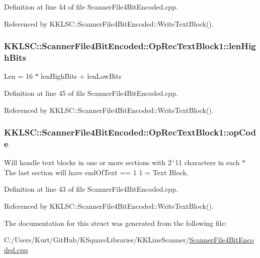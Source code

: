 Definition at line 44 of file Scanner\+File4\+Bit\+Encoded.\+cpp.



Referenced by K\+K\+L\+S\+C\+::\+Scanner\+File4\+Bit\+Encoded\+::\+Write\+Text\+Block().

\subsubsection[{\texorpdfstring{len\+High\+Bits}{lenHighBits}}]{ K\+K\+L\+S\+C\+::\+Scanner\+File4\+Bit\+Encoded\+::\+Op\+Rec\+Text\+Block1\+::len\+High\+Bits}\hypertarget{struct_scanner_file4_bit_encoded_1_1_op_rec_text_block1_a8eaf8d2ce94039bebf05c35bcd544bd0}{}\label{struct_scanner_file4_bit_encoded_1_1_op_rec_text_block1_a8eaf8d2ce94039bebf05c35bcd544bd0}
Len = 16 $\ast$ len\+High\+Bits + len\+Low\+Bits 

Definition at line 45 of file Scanner\+File4\+Bit\+Encoded.\+cpp.



Referenced by K\+K\+L\+S\+C\+::\+Scanner\+File4\+Bit\+Encoded\+::\+Write\+Text\+Block().

\subsubsection[{\texorpdfstring{op\+Code}{opCode}}]{ K\+K\+L\+S\+C\+::\+Scanner\+File4\+Bit\+Encoded\+::\+Op\+Rec\+Text\+Block1\+::op\+Code}\hypertarget{struct_scanner_file4_bit_encoded_1_1_op_rec_text_block1_ab589dd24a36a39041276ccfef5ade8e7}{}\label{struct_scanner_file4_bit_encoded_1_1_op_rec_text_block1_ab589dd24a36a39041276ccfef5ade8e7}
Will handle text blocks in one or more sections with 2$^\wedge$11 characters in each $\ast$ The last section will have \textquotesingle{}end\+Of\+Text\textquotesingle{} == \textquotesingle{}1\textquotesingle{} 1 = Text Block. 

Definition at line 43 of file Scanner\+File4\+Bit\+Encoded.\+cpp.



Referenced by K\+K\+L\+S\+C\+::\+Scanner\+File4\+Bit\+Encoded\+::\+Write\+Text\+Block().



The documentation for this struct was generated from the following file\+:\begin{DoxyCompactItemize}
\item 
C\+:/\+Users/\+Kurt/\+Git\+Hub/\+K\+Square\+Libraries/\+K\+K\+Line\+Scanner/\hyperlink{_scanner_file4_bit_encoded_8cpp}{Scanner\+File4\+Bit\+Encoded.\+cpp}\end{DoxyCompactItemize}
